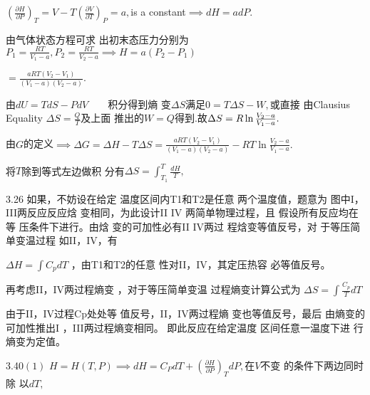 \documentclass{article}
\begin{document}
$\left( \frac{\partial H}{\partial P}\right) _{T}=V-T\left( \frac{\partial V%
}{\partial T}\right) _{P}=a,$is a constant$\implies dH=adP.$

由气体状态方程可求%
出初末态压力分别为$%
P_{1}=\frac{RT}{V_{1}-a},P_{2}=\frac{RT}{V_{2}-a}\implies H=a\left(
P_{2}-P_{1}\right) $

$=\frac{aRT\left( V_{2}-V_{1}\right) }{\left( V_{1}-a\right) \left(
V_{2}-a\right) }.$

由\qquad $dU=TdS-PdV\qquad $积分得到熵%
变$\Delta S$满足$0=T\Delta S-W,$或直接%
由Clausius Equality $\Delta S=\frac{Q}{T}$及上面%
推出的$W=Q$得到.故$\Delta S=R\ln \frac{%
V_{2}-a}{V_{1}-a}.$

由$G$的定义$\implies \Delta G=\Delta H-T\Delta S=%
\frac{aRT\left( V_{2}-V_{1}\right) }{\left( V_{1}-a\right) \left(
V_{2}-a\right) }-RT\ln \frac{V_{2}-a}{V_{1}-a}.$

将$T$除到等式左边做积%
分有$\Delta S=\int_{T_{1}}^{T}\frac{dH}{T},$

\bigskip 

\bigskip 

\bigskip 

\bigskip 

\bigskip 

3.26 如果，不妨设在给定%
温度区间内T1和T2是任意%
两个温度值，题意为%
图中I，III两反应反应焓%
变相同，为此设计II IV 
两简单物理过程，且%
假设所有反应均在等%
压条件下进行。由焓%
变的可加性必有II IV两过%
程焓变等值反号，对%
于等压简单变温过程%
如II，IV，有

$\Delta H=\int C_{p}dT$ ，由T1和T2的任意%
性对II，IV，其定压热容%
必等值反号。

再考虑II，IV两过程熵变%
，对于等压简单变温%
过程熵变计算公式为 $%
\Delta S=\int \frac{C_{p}}{T}dT$ 

由于II，IV过程Cp处处等%
值反号，II，IV两过程熵%
变也等值反号，最后%
由熵变的可加性推出I%
，III两过程熵变相同。%
即此反应在给定温度%
区间任意一温度下进%
行熵变为定值。


3.40$\left( 1\right) $ $H=H\left( T,P\right) \implies dH=C_{P}dT+\left( 
\frac{\partial H}{\partial P}\right) _{T}dP,$在$V$不变%
的条件下两边同时除%
以$dT,$
\end{document}
